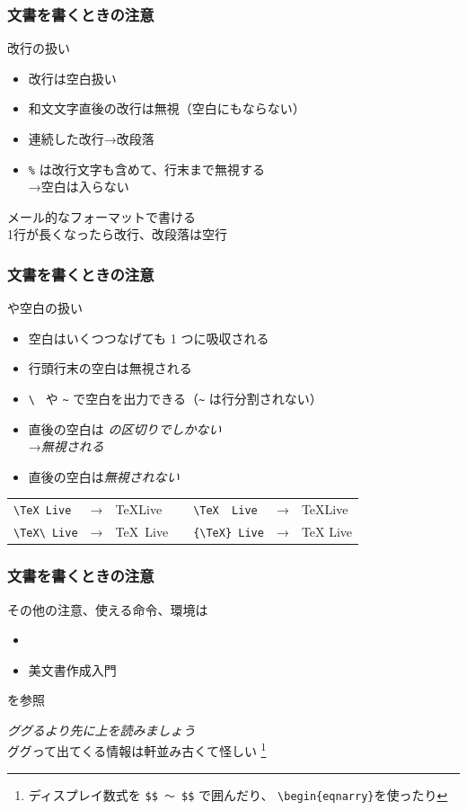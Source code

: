 \begin{frame}[fragile]
	\frametitle{文書を書くときの注意}
	\begin{block}{改行の扱い}
		\begin{itemize}
			\item 改行は空白扱い
			\item 和文文字直後の改行は無視（空白にもならない）
			\item 連続した改行→改段落
			\item \verb+%+ は改行文字も含めて、行末まで無視する\\
				→空白は入らない
		\end{itemize}
	\end{block}

	メール的なフォーマットで書ける\\
	{\footnotesize 1行が長くなったら改行、改段落は空行}
\end{frame}

\begin{frame}[fragile]
	\frametitle{文書を書くときの注意}
	\begin{block}{や空白の扱い}
		\begin{itemize}
			\item 空白はいくつつなげても 1 つに吸収される
			\item 行頭行末の空白は無視される
			\item \verb*+\ + や \verb+~+ で空白を出力できる（\verb+~+ は行分割されない）
			\item {}直後の空白は
				\emph{の区切りでしかない}\\
				→\emph{無視される}
			\item {}直後の空白は\emph{無視されない}
		\end{itemize}
	\end{block}

	\bgroup\scriptsize
	\begin{tabular}{lclclcl}
		\verb*+\TeX Live+&→&\TeX Live&\hspace*{3em}&\verb*+\TeX  Live+&→&\TeX  Live\\
		\verb*+\TeX\ Live+&→&\TeX\ Live&&\verb*+{\TeX} Live+&→&{\TeX} Live
	\end{tabular}
	\egroup
\end{frame}

\begin{frame}
	\frametitle{文書を書くときの注意}
	その他の注意、使える命令、環境は
	\begin{itemize}
		\item {}
		\item 美文書作成入門
	\end{itemize}
	を参照

	\emph{ググるより先に上を読みましょう}\\
	{\footnotesize ググって出てくる情報は軒並み古くて怪しい
	\footnote{ディスプレイ数式を \texttt{\$\$ 〜 \$\$} で囲んだり、
	\texttt{\textbackslash begin\{eqnarry\}}を使ったり}}
\end{frame}

